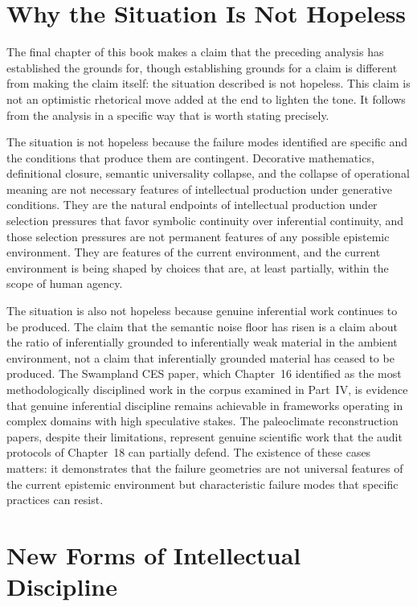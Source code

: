 \documentclass[12pt, openright, twoside]{book}
\begin{document}
\section{Why the Situation Is Not Hopeless}

The final chapter of this book makes a claim that the preceding analysis
has established the grounds for, though establishing grounds for a claim
is different from making the claim itself: the situation described is
not hopeless. This claim is not an optimistic rhetorical move added at
the end to lighten the tone. It follows from the analysis in a specific
way that is worth stating precisely.

The situation is not hopeless because the failure modes identified are
specific and the conditions that produce them are contingent. Decorative
mathematics, definitional closure, semantic universality collapse, and
the collapse of operational meaning are not necessary features of
intellectual production under generative conditions. They are the
natural endpoints of intellectual production under selection pressures
that favor symbolic continuity over inferential continuity, and those
selection pressures are not permanent features of any possible epistemic
environment. They are features of the current environment, and the
current environment is being shaped by choices that are, at least
partially, within the scope of human agency.

The situation is also not hopeless because genuine inferential work
continues to be produced. The claim that the semantic noise floor has
risen is a claim about the ratio of inferentially grounded to
inferentially weak material in the ambient environment, not a claim
that inferentially grounded material has ceased to be produced. The
Swampland CES paper, which Chapter~16 identified as the most
methodologically disciplined work in the corpus examined in Part~IV,
is evidence that genuine inferential discipline remains achievable in
frameworks operating in complex domains with high speculative stakes.
The paleoclimate reconstruction papers, despite their limitations,
represent genuine scientific work that the audit protocols of Chapter~18
can partially defend. The existence of these cases matters: it demonstrates
that the failure geometries are not universal features of the current
epistemic environment but characteristic failure modes that specific
practices can resist.

\section{New Forms of Intellectual Discipline}
\end{document}
